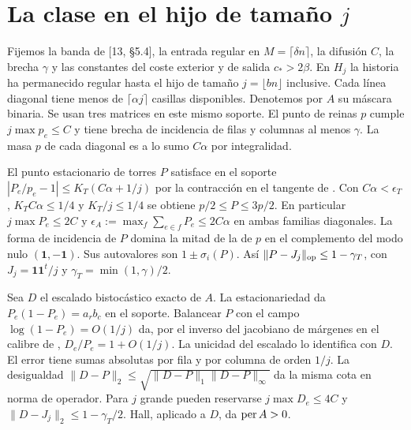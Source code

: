 \section{La clase en el hijo de tamaño \texorpdfstring{\(j\)}{j}}
Fijemos la banda de [13, §5.4], la entrada regular en \(M=\lceil\delta n\rceil\), la difusión
\(C\), la brecha \(\gamma\) y las constantes del coste exterior y de salida \(c_*>2\beta\).
En \(H_j\) la historia ha permanecido regular hasta el hijo de tamaño \(j=\lfloor bn\rfloor\)
inclusive. Cada línea diagonal tiene menos de \(\lceil\alpha j\rceil\) casillas disponibles.
Denotemos por \(A\) su máscara binaria. Se usan tres matrices en este mismo soporte.
El punto de reinas \(p\) cumple \(j\max p_e\le C\) y tiene brecha de incidencia de filas y columnas
al menos \(\gamma\). La masa \(p\) de cada diagonal es a lo sumo \(C\alpha\) por integralidad.

El punto estacionario de torres \(P\) satisface en el soporte
\(|P_e/p_e-1|\le K_T(C\alpha+1/j)\) por la contracción en el tangente de
. Con \(C\alpha<\epsilon_T\), \(K_TC\alpha\le1/4\) y \(K_T/j\le1/4\)
se obtiene \(p/2\le P\le 3p/2\). En particular \(j\max P_e\le 2C\) y
\(\epsilon_A:=\max_f\sum_{e\in f}P_e\le2C\alpha\) en ambas familias diagonales.
La forma de incidencia de \(P\) domina la mitad de la de \(p\) en el complemento
del modo nulo \((\mathbf1,-\mathbf1)\). Sus autovalores son \(1\pm\sigma_i(P)\).
Así \(\|P-J_j\|_{\rm op}\le1-\gamma_T\), con
\(J_j=\mathbf1\mathbf1^t/j\) y \(\gamma_T=\min(1,\gamma)/2\).

Sea \(D\) el escalado bistocástico exacto de \(A\). La estacionariedad da
\(P_e(1-P_e)=a_rb_c\) en el soporte. Balancear \(P\) con el campo
\(\log(1-P_e)=O(1/j)\) da, por el inverso del jacobiano de márgenes en el calibre de
, \(D_e/P_e=1+O(1/j)\). La unicidad del escalado lo identifica con \(D\).
El error tiene sumas absolutas por fila y por columna de orden \(1/j\). La desigualdad
\(\|D-P\|_2\le\sqrt{\|D-P\|_1\|D-P\|_\infty}\) da la misma cota en norma de operador.
Para \(j\) grande pueden reservarse \(j\max D_e\le4C\) y
\(\|D-J_j\|_2\le1-\gamma_T/2\). Hall, aplicado a \(D\), da \(\operatorname{per} A>0\).

